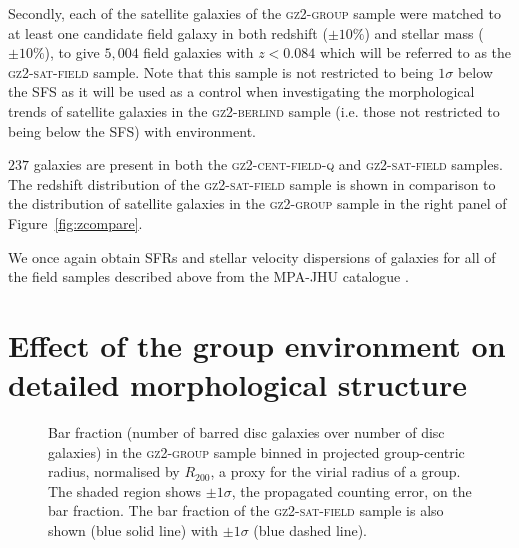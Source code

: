 \documentclass[useAMS,usenatbib]{mn2e}
\begin{document}
Secondly, each of the satellite galaxies of the \textsc{gz2-group} sample were matched to at least one candidate field galaxy in both redshift ($\pm10\%$) and stellar mass ($\pm10\%$), to give $5,004$ field galaxies with $z < 0.084$ which will be referred to as the \textsc{gz2-sat-field} sample.  Note that this sample is not restricted to being $1\sigma$ below the SFS as it will be used as a control when investigating the morphological trends of satellite galaxies in the \textsc{gz2-berlind} sample (i.e. those not restricted to being below the SFS) with environment. 

$237$ galaxies are present in both the \textsc{gz2-cent-field-q} and \textsc{gz2-sat-field} samples. The redshift distribution of the \textsc{gz2-sat-field} sample is shown in comparison to the distribution of satellite galaxies in the \textsc{gz2-group} sample in the right panel of Figure~\ref{fig:zcompare}.

We once again obtain SFRs and stellar velocity dispersions of galaxies for all of the field samples described above from the MPA-JHU catalogue \citep{kauffmann03, brinchmann04}.


\section{Effect of the group environment on detailed morphological structure}\label{sec:morphfrac}

\begin{figure}
\caption[Bar fraction with group radius in the \textsc{gz2-group} sample]{Bar fraction (number of barred disc galaxies over number of disc galaxies) in the \textsc{gz2-group} sample binned in projected group-centric radius, normalised by $R_{200}$, a proxy for the virial radius of a group. The shaded region shows $\pm1\sigma$, the propagated counting error, on the bar fraction. The bar fraction of the \textsc{gz2-sat-field} sample is also shown (blue solid line) with $\pm1\sigma$ (blue dashed line).}
\label{fig:barradius}
\end{figure}
\end{document}
